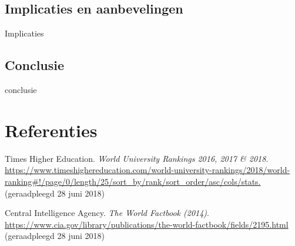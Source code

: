 \documentclass{uva-inf-article}
\begin{document}
\subsection{Implicaties en aanbevelingen}
Implicaties

\subsection{Conclusie}
conclusie


\section{Referenties}
\begin{thebibliography}{9}
Times Higher Education. \textit{World University Rankings 2016, 2017 \& 2018}. \url{https://www.timeshighereducation.com/world-university-rankings/2018/world-ranking#!/page/0/length/25/sort_by/rank/sort_order/asc/cols/stats.} (geraadpleegd 28 juni 2018)

Central Intelligence Agency. \textit{The World Factbook (2014)}. \url{https://www.cia.gov/library/publications/the-world-factbook/fields/2195.html}   (geraadpleegd 28 juni 2018)

\end{thebibliography}


\end{document}
